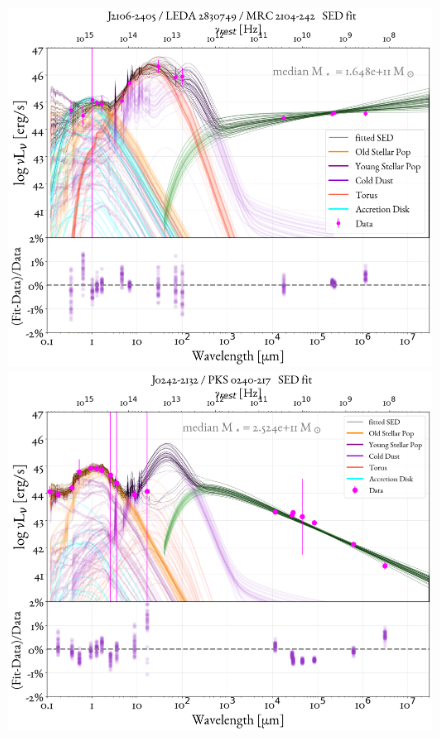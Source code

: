\begin{figure}
    \centering
    \includegraphics[width=0.85\linewidth]{figures/ResultFits/115_SEDfit_5355.png}\\
    \includegraphics[width=0.85\linewidth]{figures/ResultFits/116_SEDfit_6000.png}   
\end{figure}

